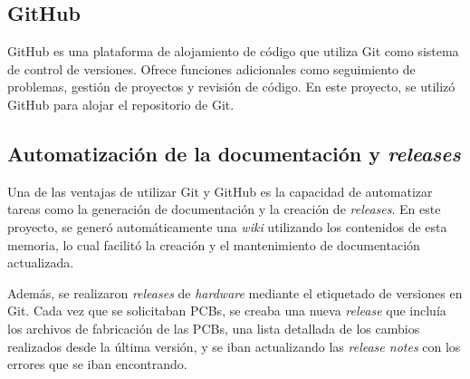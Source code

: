 \subsection{GitHub}
GitHub es una plataforma de alojamiento de código que utiliza Git como sistema de control de versiones. Ofrece funciones adicionales como seguimiento de problemas, gestión de proyectos y revisión de código. En este proyecto, se utilizó GitHub para alojar el repositorio de Git.

\subsection{Automatización de la documentación y \textit{releases}}
Una de las ventajas de utilizar Git y GitHub es la capacidad de automatizar tareas como la generación de documentación y la creación de \textit{releases}. En este proyecto, se generó automáticamente una \textit{wiki} utilizando los contenidos de esta memoria, lo cual facilitó la creación y el mantenimiento de documentación actualizada.

Además, se realizaron \textit{releases} de \textit{hardware} mediante el etiquetado de versiones en Git. Cada vez que se solicitaban PCBs, se creaba una nueva \textit{release} que incluía los archivos de fabricación de las PCBs, una lista detallada de los cambios realizados desde la última versión, y se iban actualizando las \textit{release notes} con los errores que se iban encontrando.


